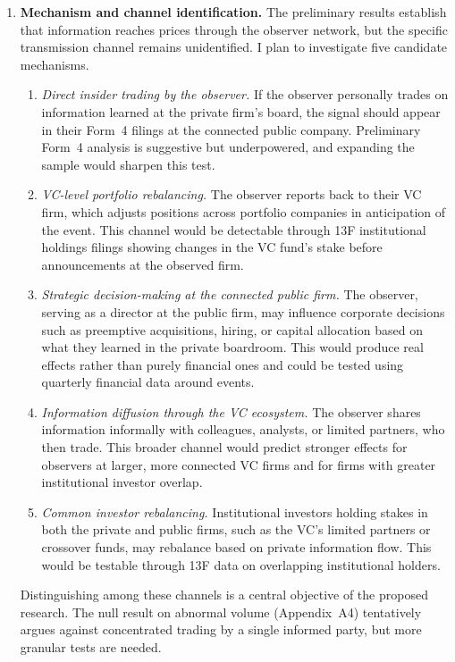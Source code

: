 \begin{enumerate}
\item \textbf{Mechanism and channel identification.} The preliminary results establish that information reaches prices through the observer network, but the specific transmission channel remains unidentified. I plan to investigate five candidate mechanisms.
\begin{enumerate}[label=(\alph*)]
\item \textit{Direct insider trading by the observer.} If the observer personally trades on information learned at the private firm's board, the signal should appear in their Form~4 filings at the connected public company. Preliminary Form~4 analysis is suggestive but underpowered, and expanding the sample would sharpen this test.
\item \textit{VC-level portfolio rebalancing.} The observer reports back to their VC firm, which adjusts positions across portfolio companies in anticipation of the event. This channel would be detectable through 13F institutional holdings filings showing changes in the VC fund's stake before announcements at the observed firm.
\item \textit{Strategic decision-making at the connected public firm.} The observer, serving as a director at the public firm, may influence corporate decisions such as preemptive acquisitions, hiring, or capital allocation based on what they learned in the private boardroom. This would produce real effects rather than purely financial ones and could be tested using quarterly financial data around events.
\item \textit{Information diffusion through the VC ecosystem.} The observer shares information informally with colleagues, analysts, or limited partners, who then trade. This broader channel would predict stronger effects for observers at larger, more connected VC firms and for firms with greater institutional investor overlap.
\item \textit{Common investor rebalancing.} Institutional investors holding stakes in both the private and public firms, such as the VC's limited partners or crossover funds, may rebalance based on private information flow. This would be testable through 13F data on overlapping institutional holders.
\end{enumerate}
Distinguishing among these channels is a central objective of the proposed research. The null result on abnormal volume (Appendix~A4) tentatively argues against concentrated trading by a single informed party, but more granular tests are needed.


\end{enumerate}
